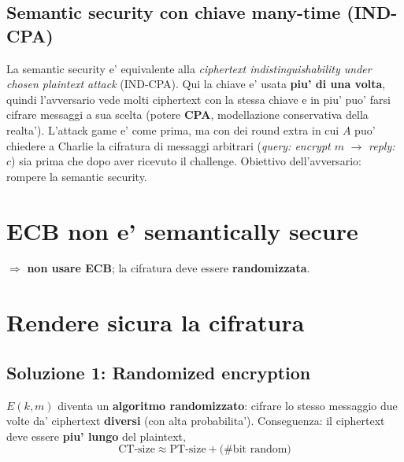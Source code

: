 \subsection{Semantic security con chiave many-time (IND-CPA)}
La semantic security e' equivalente alla \textit{ciphertext indistinguishability under chosen plaintext attack} (IND-CPA). Qui la chiave e' usata \textbf{piu' di una volta}, quindi l'avversario vede molti ciphertext con la stessa chiave e in piu' puo' farsi cifrare messaggi a sua scelta (potere \textbf{CPA}, modellazione conservativa della realta'). L'attack game e' come prima, ma con dei round extra in cui $ A $ puo' chiedere a Charlie la cifratura di messaggi arbitrari (\textit{query: encrypt $ m $} $ \to $ \textit{reply: $ c $}) sia prima che dopo aver ricevuto il challenge. Obiettivo dell'avversario: rompere la semantic security.

\section{ECB non e' semantically secure}
$ \Rightarrow $ \textbf{non usare ECB}; la cifratura deve essere \textbf{randomizzata}.

\section{Rendere sicura la cifratura}

\subsection{Soluzione 1: Randomized encryption}
$ E(k, m) $ diventa un \textbf{algoritmo randomizzato}: cifrare lo stesso messaggio due volte da' ciphertext \textbf{diversi} (con alta probabilita'). Conseguenza: il ciphertext deve essere \textbf{piu' lungo} del plaintext,
\[
  \text{CT-size} \approx \text{PT-size} + \text{(\# bit random)}
\]

